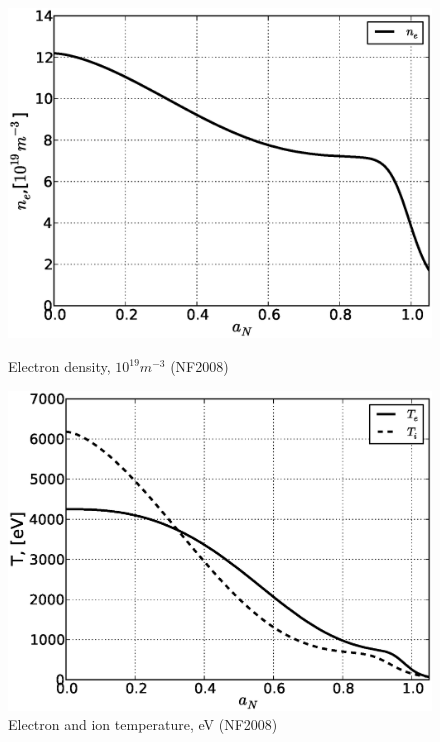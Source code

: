 \documentclass[11pt,oneside,a4paper,notitlepage]{article}
\begin{document}
\begin{figure}[h]
\begin{center}
\begin{minipage}[h]{0.4\linewidth} 
 \centering
 \includegraphics[width=1.35\linewidth]{ne.eps}
 \caption{Electron density, $10^{19} m^{-3}$ (NF2008)}
 \label{fig:ne}
\end{minipage}
\hfill
\begin{minipage}[h]{0.4\linewidth}
 \centering
 \includegraphics[width=1.35\linewidth]{T.eps}
 \caption{Electron and ion temperature, eV (NF2008)}
 \label{fig:T}
\end{minipage}
\end{center}
\end{figure}
\end{document}
